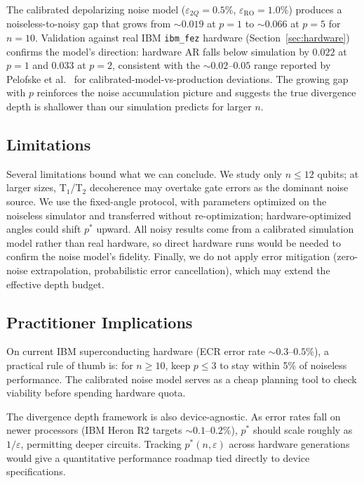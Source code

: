 \documentclass[12pt]{article}
\begin{document}
The calibrated depolarizing noise model ($\varepsilon_{2Q} = 0.5\%$, $\varepsilon_{\text{RO}} = 1.0\%$) produces a noiseless-to-noisy gap that grows from $\sim 0.019$ at $p = 1$ to $\sim 0.066$ at $p = 5$ for $n = 10$. Validation against real IBM \texttt{ibm\_fez} hardware (Section~\ref{sec:hardware}) confirms the model's direction: hardware AR falls below simulation by $0.022$ at $p=1$ and $0.033$ at $p=2$, consistent with the $\sim 0.02$--$0.05$ range reported by Pelofske et al.\ \cite{pelofske2022quantum} for calibrated-model-vs-production deviations. The growing gap with $p$ reinforces the noise accumulation picture and suggests the true divergence depth is shallower than our simulation predicts for larger $n$.

\subsection{Limitations}

Several limitations bound what we can conclude. We study only $n \leq 12$ qubits; at larger sizes, T$_1$/T$_2$ decoherence may overtake gate errors as the dominant noise source. We use the fixed-angle protocol, with parameters optimized on the noiseless simulator and transferred without re-optimization; hardware-optimized angles could shift $p^*$ upward. All noisy results come from a calibrated simulation model rather than real hardware, so direct hardware runs would be needed to confirm the noise model's fidelity. Finally, we do not apply error mitigation (zero-noise extrapolation, probabilistic error cancellation), which may extend the effective depth budget.

\subsection{Practitioner Implications}

On current IBM superconducting hardware (ECR error rate $\sim 0.3$--$0.5\%$), a practical rule of thumb is: for $n \geq 10$, keep $p \leq 3$ to stay within 5\% of noiseless performance. The calibrated noise model serves as a cheap planning tool to check viability before spending hardware quota.

The divergence depth framework is also device-agnostic. As error rates fall on newer processors (IBM Heron R2 targets $\sim 0.1$--$0.2\%$), $p^*$ should scale roughly as $1/\varepsilon$, permitting deeper circuits. Tracking $p^*(n, \varepsilon)$ across hardware generations would give a quantitative performance roadmap tied directly to device specifications.
\end{document}
